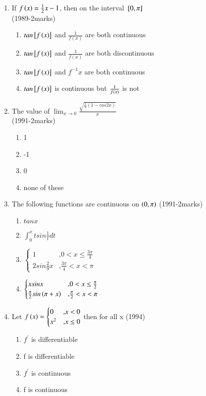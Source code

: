 \documentclass[journal,12pt,twocolumn]{IEEEtran}
\theoremstyle{remark}
\begin{document}
\begin{enumerate}
\begin{enumerate}
			\end{enumerate}
		\item If $f\left(x\right) = \frac{1}{2}x-1$, then on the interval ${}\left[0,\pi\right]$ \\ \hfill{(1989-2marks)}
			\begin{enumerate}
				\item $tan{}\left[f\left(x\right)\right]$ and $\frac{1}{f(x)}$ are both continuous
				\item $tan{}\left[f\left(x\right)\right]$ and $\frac{1}{f(x)}$ are both discontinuous
				\item $tan{}\left[f\left(x\right)\right]$ and $f^{-1}x$ are both continuous
				\item $tan{}\left[f\left(x\right)\right]$ is continuous but $\frac{1}{f\left(x\right)}$ is not \\
			\end{enumerate}
		\item The value of $\lim_{x\to0}{\frac{\sqrt{\frac{1}{2}(1-cos2x)}}{x}}$ \\ \hfill{(1991-2marks)}
			\begin{enumerate}
				\item 1
				\item -1
				\item 0
				\item none of these \\
			\end{enumerate}
		\item The following functions are continuous on $\left(0,\pi\right)$ \hfill{(1991-2marks)}
			\begin{enumerate}
				\item $tanx$
				\item $\int_{0}^{x}tsin\frac{1}{t}dt$ 
				\item $\begin{cases} 1 & \text{,} 0<x\leq\frac{3\pi}{4} \\
						2sin\frac{2}{9}x & \text{,} \frac{3\pi}{4}<x<\pi \end{cases}$
					\item $\begin{cases} xsinx & \text{,} 0<x\leq\frac{\pi}{2} \\ \frac{\pi}{2}sin\left(\pi+x\right) & \text{,} \frac{\pi}{2}<x<\pi \\ \end{cases}$
			\end{enumerate}
		\item Let $f\left(x\right)=\begin{cases} 0 & \text{,} x<0 \\
                             x^2 & \text{,} x\leq0 \end{cases}$ then for all x \hfill{(1994)}
			     \begin{enumerate}
				     \item $f^\prime$ is differentiable
				     \item f is differentiable
				     \item $f^\prime$ is continuous
				     \item f is continuous
			     \end{enumerate}


\end{enumerate}
\end{document}

